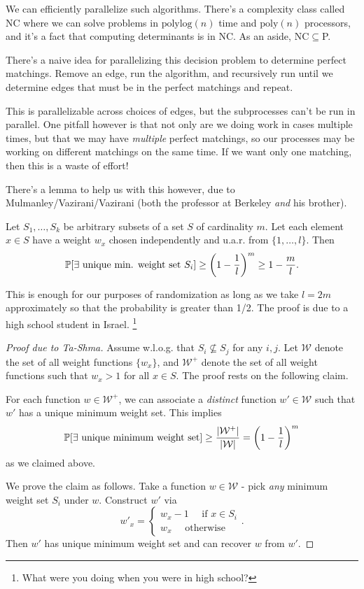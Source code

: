 \documentclass[11 pt]{scrartcl}
\begin{document}
We can efficiently parallelize such algorithms. There's a complexity class called NC where we can solve problems in $\text{polylog}(n)$ time and $\text{poly}(n)$ processors, and it's a fact that computing determinants is in NC. As an aside, NC$\subseteq$P. 

There's a naive idea for parallelizing this decision problem to determine perfect matchings. Remove an edge, run the algorithm, and recursively run until we determine edges that must be in the perfect matchings and repeat. 

This is parallelizable across choices of edges, but the subprocesses can't be run in parallel. One pitfall however is that not only are we doing work in cases multiple times, but that we may have \emph{multiple} perfect matchings, so our processes may be working on different matchings on the same time. If we want only one matching, then this is a waste of effort! 

There's a lemma to help us with this however, due to Mulmanley/Vazirani/Vazirani (both the professor at Berkeley \emph{and} his brother).  

\begin{lemma}
    Let $S_1, \dots, S_k$ be arbitrary subsets of a set $S$ of cardinality $m$. Let each element $x\in S$ have a weight $w_x$ chosen independently and u.a.r.  from $\{1, \dots, l\}$. Then 
    \[ \mathbb P[ \exists\text{ unique min. weight set }S_i] \geq \left(1-\frac{1}{l}\right)^m \geq 1 - \dfrac{m}{l}.\] 
\end{lemma}

This is enough for our purposes of randomization as long as we take $l = 2m$ approximately so that the probability is greater than 1/2. The proof is due to a high school student in Israel. \footnote{What were you doing when you were in high school?}

\begin{proof}[Proof due to Ta-Shma]
    Assume w.l.o.g. that $S_i \not\subseteq S_j$ for any $i,j$. Let $\mathcal{W}$ denote the set of all weight functions $\{w_x\}$, and $\mathcal{W}^+$ denote the set of all weight functions such that $w_x > 1$ for all $x\in S$. The proof rests on the following claim.

    \begin{claim}
        For each function $w\in \mathcal{W}^+$, we can associate a \emph{distinct} function $w'\in \mathcal{W}$ such that $w'$ has a unique minimum weight set. This implies 
        \[ \mathbb P[\exists\text{ unique minimum weight set}] \geq \dfrac{|\mathcal{W}^+|}{|\mathcal{W}|} = \left(1-\dfrac{1}{l}\right)^m \] 
        as we claimed above. 
    \end{claim}
        We prove the claim as follows. Take a function $w\in \mathcal{W}$ - pick \emph{any} minimum weight set $S_i$ under $w$. Construct $w'$ via 
        \[ w'_x = \begin{cases} w_x-1 \quad \text{ if } x \in S_i \\ w_x \quad \text{ otherwise} \end{cases}.\] 
        Then $w'$ has unique minimum weight set and can recover $w$ from $w'$. 
\end{proof}
\end{document}
